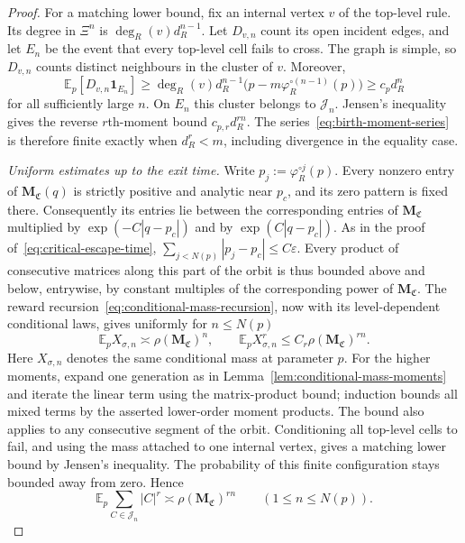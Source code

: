 \documentclass[scheme=plain,11pt]{ctexart}
\theoremstyle{definition}
\theoremstyle{remark}
\begin{document}
\begin{proof}
For a matching lower bound, fix an internal vertex $v$ of the top-level rule.
Its degree in $\Xi^n$ is $\deg_R(v)d_R^{n-1}$.
Let $D_{v,n}$ count its open incident edges, and let $E_n$ be the event that every top-level cell fails to cross.
The graph is simple, so $D_{v,n}$ counts distinct neighbours in the cluster of $v$.
Moreover,
\[
 \mathbb E_p[D_{v,n}\mathbf1_{E_n}]
 \ge\deg_R(v)d_R^{n-1}
 \bigl(p-m\varphi_R^{\circ(n-1)}(p)\bigr)
 \ge c_pd_R^n
\]
for all sufficiently large $n$.
On $E_n$ this cluster belongs to $\mathcal J_n$.
Jensen's inequality gives the reverse $r$th-moment bound $c_{p,r}d_R^{rn}$.
The series~\eqref{eq:birth-moment-series} is therefore finite exactly when $d_R^r<m$, including divergence in the equality case.

\emph{Uniform estimates up to the exit time.}
Write $p_j:=\varphi_R^{\circ j}(p)$.
Every nonzero entry of $\mathbf M_{\mathfrak C}(q)$ is strictly positive and analytic near $p_c$, and its zero pattern is fixed there.
Consequently its entries lie between the corresponding entries of $\mathbf M_{\mathfrak C}$ multiplied by $\exp(-C|q-p_c|)$ and by $\exp(C|q-p_c|)$.
As in the proof of~\eqref{eq:critical-escape-time},
$\sum_{j<N(p)}|p_j-p_c|\le C\varepsilon$.
Every product of consecutive matrices along this part of the orbit is thus bounded above and below, entrywise, by constant multiples of the corresponding power of $\mathbf M_{\mathfrak C}$.
The reward recursion~\eqref{eq:conditional-mass-recursion}, now with its level-dependent conditional laws, gives uniformly for $n\le N(p)$
\[
 \mathbb E_p X_{\sigma,n}\asymp\rho(\mathbf M_{\mathfrak C})^n,
 \qquad
 \mathbb E_p X_{\sigma,n}^r\le C_r\rho(\mathbf M_{\mathfrak C})^{rn}.
\]
Here $X_{\sigma,n}$ denotes the same conditional mass at parameter $p$.
For the higher moments, expand one generation as in Lemma~\ref{lem:conditional-mass-moments} and iterate the linear term using the matrix-product bound; induction bounds all mixed terms by the asserted lower-order moment products.
The bound also applies to any consecutive segment of the orbit.
Conditioning all top-level cells to fail, and using the mass attached to one internal vertex, gives a matching lower bound by Jensen's inequality.
The probability of this finite configuration stays bounded away from zero.
Hence
\begin{equation}\label{eq:pre-exit-birth-moment}
 \mathbb E_p\sum_{C\in\mathcal J_n}|C|^r
 \asymp\rho(\mathbf M_{\mathfrak C})^{rn}
 \qquad(1\le n\le N(p)).
\end{equation}


\end{proof}
\end{document}
